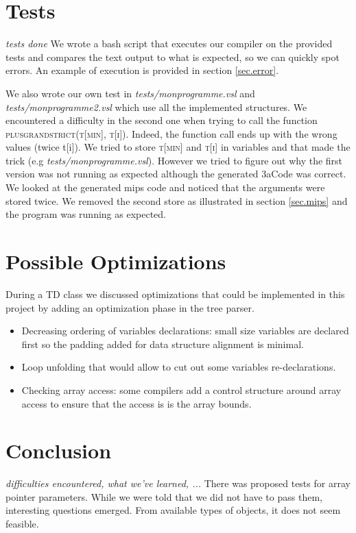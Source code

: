 \documentclass[a4paper,11pt,english]{article}
\begin{document}
\section{Tests}
\textit{tests done}
We wrote a bash script that executes our compiler on the provided tests and compares the text output to what is expected, so we can quickly spot errors. An example of execution is provided in section \ref{sec.error}.

We also wrote our own test in \textit{tests/monprogramme.vsl} and \textit{tests/monprogramme2.vsl} which use all the implemented structures.
We encountered a difficulty in the second one when trying to call the function \textsc{plusgrandstrict(t[min], t[i])}.
Indeed, the function call ends up with the wrong values (twice t[i]).
We tried to store \textsc{t[min]} and \textsc{t[i]} in variables and that made the trick (e.g \textit{tests/monprogramme.vsl}).
However we tried to figure out why the first version was not running as expected although the generated 3aCode was correct.
We looked at the generated mips code and noticed that the arguments were stored twice.
We removed the second store as illustrated in section \ref{sec.mips} and the program was running as expected. 

\section{Possible Optimizations}
During a TD class we discussed optimizations that could be implemented in this project by adding an optimization phase in the tree parser.
\begin{itemize}
 \item Decreasing ordering of variables declarations: small size variables are declared first so the padding added for data structure alignment is minimal.
 \item Loop unfolding that would allow to cut out some variables re-declarations.
 \item Checking array access: some compilers add a control structure around array access to ensure that the access is is the array bounds. 
\end{itemize}

\section{Conclusion}
\textit{difficulties encountered, what we've learned, ...}
There was proposed tests for array pointer parameters.
While we were told that we did not have to pass them, interesting questions emerged.
From available types of objects, it does not seem feasible.
\end{document}
